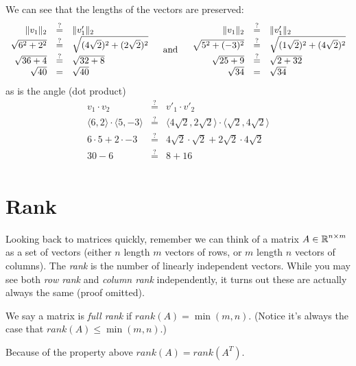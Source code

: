 We can see that the lengths of the vectors are preserved: 
\[
\begin{array}{rcl}
\|v_1\|_2 & \stackrel{?}{=} & \|v'_1\|_2\\
\sqrt{6^2+2^2} & \stackrel{?}{=} & \sqrt{(4\sqrt{2})^2+(2\sqrt{2})^2}\\
\sqrt{36+4} & \stackrel{?}{=} & \sqrt{32 + 8}\\
\sqrt{40} & = & \sqrt{40}\\
\end{array}\;\;\;\;\textnormal{and}\;\;\;\; 
\begin{array}{rcl}
\|v_1\|_2 & \stackrel{?}{=} & \|v'_1\|_2\\
\sqrt{5^2+(-3)^2} & \stackrel{?}{=} & \sqrt{(1\sqrt{2})^2+(4\sqrt{2})^2}\\
\sqrt{25+9} & \stackrel{?}{=} & \sqrt{2 + 32}\\
\sqrt{34} & = & \sqrt{34}\\
\end{array} 
\]
as is the angle (dot product)
\[\begin{array}{rcl}
v_1 \cdot v_2 & \stackrel{?}{=} & v'_1 \cdot v'_2 \\
\langle6,2\rangle\cdot \langle5,-3\rangle&  \stackrel{?}{=}  & \langle4\sqrt{2},2\sqrt{2}\rangle\cdot\langle\sqrt{2},4\sqrt{2}\rangle\\
6\cdot5+2\cdot-3&  \stackrel{?}{=}  & 4\sqrt{2}\cdot\sqrt{2}+2\sqrt{2}\cdot4\sqrt{2}\\
30-6 &  \stackrel{?}{=}  & 8 + 16\\

\end{array} 
\]

\section{Rank}
Looking back to matrices quickly,
remember we can think of a matrix $A\in\operatorname{\mathbb{R}}^{n\times m}$ as a set of vectors (either $n$ length $m$ vectors of rows, or $m$ length $n$ vectors of columns). 
The \emph{rank} is the number of linearly independent vectors. 
While you may see both \textit{row rank} and \textit{column rank} independently, 
it turns out these are actually always the same (proof omitted). 

We say a matrix is \emph{full rank} if $rank(A)=\min(m,n)$. (Notice it's always the case that $rank(A)\le\min(m,n)$.)

Because of the property above $rank(A) = rank(A^T)$. 

